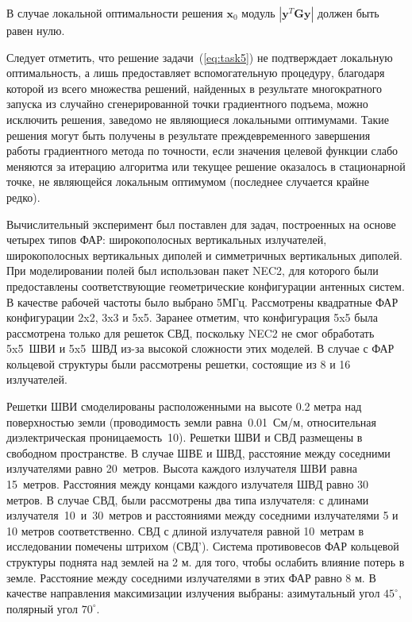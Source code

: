 В случае локальной оптимальности решения $\textbf{x}_0$ модуль $|\textbf{y}^T\textbf{G}\textbf{y}|$ должен быть равен нулю.

Следует отметить, что решение задачи~(\ref{eq:task5}) не подтверждает локальную оптимальность, а лишь предоставляет вспомогательную процедуру, благодаря которой из всего множества решений, найденных в результате многократного запуска из случайно сгенерированной точки
градиентного подъема, можно исключить решения, заведомо не являющиеся локальными оптимумами. Такие решения могут быть получены в результате преждевременного завершения работы градиентного метода по точности, если значения целевой функции слабо меняются за итерацию алгоритма или текущее решение оказалось в стационарной точке, не являющейся локальным оптимумом (последнее случается крайне редко).

Вычислительный эксперимент был поставлен для задач, построенных на основе четырех типов ФАР: широкополосных вертикальных излучателей, широкополосных вертикальных диполей и симметричных вертикальных диполей. При моделировании полей был использован пакет NEC2, для которого были предоставлены соответствующие геометрические конфигурации антенных систем. В качестве рабочей частоты было выбрано 5МГц. Рассмотрены квадратные ФАР конфигурации 2x2, 3x3 и 5x5. Заранее отметим, что конфигурация 5x5 была рассмотрена только для решеток СВД, поскольку NEC2 не смог обработать 5x5~ШВИ и 5x5~ШВД из-за высокой сложности этих моделей. В случае с ФАР кольцевой структуры были рассмотрены решетки, состоящие из 8 и 16 излучателей.

Решетки ШВИ смоделированы расположенными на высоте 0.2 метра над поверхностью земли (проводимость земли равна~0.01~См/м, относительная диэлектрическая проницаемость~10). Решетки ШВИ и СВД размещены в свободном пространстве. В случае ШВЕ и ШВД, расстояние между соседними излучателями равно 20~метров. Высота каждого излучателя ШВИ равна 15~метров. Расстояния между концами каждого излучателя ШВД равно 30 метров. В случае СВД, были рассмотрены два типа излучателя: с длинами излучателя~10~и~30~метров и расстояниями между соседними излучателями 5 и 10 метров соответственно. СВД с длиной излучателя равной 10~метрам в исследовании помечены штрихом (СВД'). Система противовесов ФАР кольцевой структуры поднята над землей на 2 м. для того, чтобы ослабить влияние потерь в земле. Расстояние между соседними излучателями в этих ФАР равно 8 м. В качестве направления максимизации излучения выбраны: азимутальный угол $45^{\circ}$, полярный угол $70^{\circ}$.

